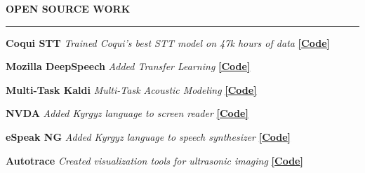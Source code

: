 \documentclass{resume} %
\begin{document}

\vspace{.5cm}
\sectionskip
\MakeUppercase{\textbf{Open Source Work}}
  \sectionlineskip
  \hrule
\vspace{.5cm}

{\textbf{Coqui STT}} {\hfill \textit{Trained Coqui's best STT model on 47k hours of data} {\hspace{2.5cm} \href{https://github.com/coqui-ai/STT/releases/tag/v1.0.0}{\textbf{[Code]}}}} \\\vspace{-.35cm}

{\textbf{Mozilla DeepSpeech}} {\hfill \textit{Added Transfer Learning} {\hspace{2.5cm} \href{https://github.com/mozilla/DeepSpeech/releases/tag/v0.7.0}{\textbf{[Code]}}}} \\\vspace{-.35cm}

{\textbf{Multi-Task Kaldi}} {\hfill \textit{Multi-Task Acoustic Modeling} {\hspace{2.5cm} \href{https://github.com/JRMeyer/multi-task-kaldi}{\textbf{[Code]}}}} \\\vspace{-.35cm}

{\textbf{NVDA}} {\hfill \textit{Added Kyrgyz language to screen reader} {\hspace{2.5cm} \href{https://github.com/JRMeyer/nvda}{\textbf{[Code]}}}} \\\vspace{-.35cm}

{\textbf{eSpeak NG}} {\hfill \textit{Added Kyrgyz language to speech synthesizer} {\hspace{2.5cm} \href{https://github.com/rhdunn/espeak/commits?author=JRMeyer}{\textbf{[Code]}}}}\\\vspace{-.35cm}

{\textbf{Autotrace}} {\hfill \textit{Created visualization tools for ultrasonic imaging} {\hspace{2.5cm} \href{https://github.com/JRMeyer/Autotrace}{\textbf{[Code]}}}} \\



\end{document}
